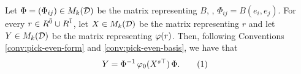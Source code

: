 \begin{prop}\label{prop:matrix-vphi}
    Let $\Phi = (\Phi_{ij}) \in M_k(\mathcal{D})$ be the matrix representing $B$, \ie, $\Phi_{ij} = B(e_i, e_j)$. For every $r\in  R^{\bar0} \cup R^{\bar1}$, let $X \in M_k(\mathcal{D})$ be the matrix representing $r$ and let $Y \in M_k(\mathcal{D})$ be the matrix representing $\varphi(r)$.
    Then, following Conventions \ref{conv:pick-even-form} and \ref{conv:pick-even-basis}, we have that
    \begin{align}
        Y &= \Phi\inv\, \vphi_0( X\stransp )\, \Phi. \addtocounter{equation}{1}\tag{\theequation}\label{eq:matrix-vphi-D-even}
    \end{align}
\end{prop}

